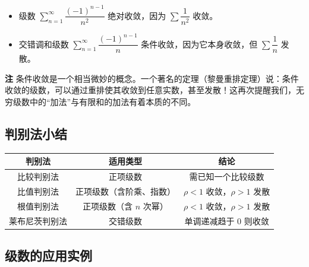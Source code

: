 \documentclass[fontset=fandol]{ctexart}
\newenvironment{custom}[1]{\par\noindent\textbf{#1}\quad}{\par\vspace{0.8em}}
\begin{document}
\begin{example}
\begin{itemize}
\item 级数 \(\sum_{n=1}^{\infty} \dfrac{(-1)^{n-1}}{n^2}\) 绝对收敛，因为 \(\sum \dfrac{1}{n^2}\) 收敛。
\item 交错调和级数 \(\sum_{n=1}^{\infty} \dfrac{(-1)^{n-1}}{n}\) 条件收敛，因为它本身收敛，但 \(\sum \dfrac{1}{n}\) 发散。
\end{itemize}
\end{example}

\begin{custom}{注}
条件收敛是一个相当微妙的概念。一个著名的定理（黎曼重排定理）说：条件收敛的级数，可以通过重排使其收敛到任意实数，甚至发散！这再次提醒我们，无穷级数中的“加法”与有限和的加法有着本质的不同。
\end{custom}

\subsection{判别法小结}

\begin{tabular}{|c|c|c|}
\hline
\textbf{判别法} & \textbf{适用类型} & \textbf{结论} \\
\hline
比较判别法 & 正项级数 & 需已知一个比较级数 \\
\hline
比值判别法 & 正项级数（含阶乘、指数） & \(\rho < 1\) 收敛，\(\rho > 1\) 发散 \\
\hline
根值判别法 & 正项级数（含 \(n\) 次幂） & \(\rho < 1\) 收敛，\(\rho > 1\) 发散 \\
\hline
莱布尼茨判别法 & 交错级数 & 单调递减趋于 0 则收敛 \\
\hline
\end{tabular}

\subsection{级数的应用实例}
\end{document}
